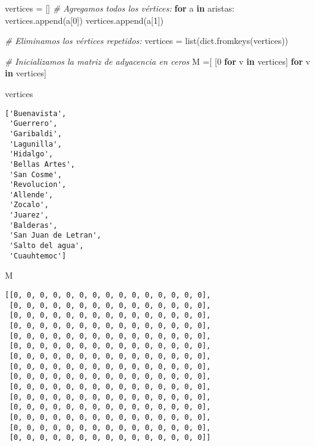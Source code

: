 \documentclass[
]{article}
\newenvironment{Shaded}{}{}
\newcommand{\BuiltInTok}[1]{#1}
\newcommand{\CommentTok}[1]{\textcolor[rgb]{0.38,0.63,0.69}{\textit{#1}}}
\newcommand{\ControlFlowTok}[1]{\textcolor[rgb]{0.00,0.44,0.13}{\textbf{#1}}}
\newcommand{\DecValTok}[1]{\textcolor[rgb]{0.25,0.63,0.44}{#1}}
\newcommand{\KeywordTok}[1]{\textcolor[rgb]{0.00,0.44,0.13}{\textbf{#1}}}
\newcommand{\NormalTok}[1]{#1}
\newcommand{\OperatorTok}[1]{\textcolor[rgb]{0.40,0.40,0.40}{#1}}
\begin{document}
\begin{Shaded}
\begin{Highlighting}[]
\NormalTok{vertices }\OperatorTok{=}\NormalTok{ []}
\CommentTok{\# Agregamos todos los vértices:}
\ControlFlowTok{for}\NormalTok{ a }\KeywordTok{in}\NormalTok{ aristas:}
\NormalTok{  vertices.append(a[}\DecValTok{0}\NormalTok{])}
\NormalTok{  vertices.append(a[}\DecValTok{1}\NormalTok{])}

\CommentTok{\# Eliminamos los vértices repetidos:}
\NormalTok{vertices }\OperatorTok{=} \BuiltInTok{list}\NormalTok{(}\BuiltInTok{dict}\NormalTok{.fromkeys(vertices))}

\CommentTok{\# Inicializamos la matriz de adyacencia en ceros}
\NormalTok{M }\OperatorTok{=}\NormalTok{[ [}\DecValTok{0} \ControlFlowTok{for}\NormalTok{ v }\KeywordTok{in}\NormalTok{ vertices] }\ControlFlowTok{for}\NormalTok{ v }\KeywordTok{in}\NormalTok{ vertices]}
\end{Highlighting}
\end{Shaded}

\begin{Shaded}
\begin{Highlighting}[]
\NormalTok{vertices}
\end{Highlighting}
\end{Shaded}

\begin{verbatim}
['Buenavista',
 'Guerrero',
 'Garibaldi',
 'Lagunilla',
 'Hidalgo',
 'Bellas Artes',
 'San Cosme',
 'Revolucion',
 'Allende',
 'Zocalo',
 'Juarez',
 'Balderas',
 'San Juan de Letran',
 'Salto del agua',
 'Cuauhtemoc']
\end{verbatim}

\begin{Shaded}
\begin{Highlighting}[]
\NormalTok{M}
\end{Highlighting}
\end{Shaded}

\begin{verbatim}
[[0, 0, 0, 0, 0, 0, 0, 0, 0, 0, 0, 0, 0, 0, 0],
 [0, 0, 0, 0, 0, 0, 0, 0, 0, 0, 0, 0, 0, 0, 0],
 [0, 0, 0, 0, 0, 0, 0, 0, 0, 0, 0, 0, 0, 0, 0],
 [0, 0, 0, 0, 0, 0, 0, 0, 0, 0, 0, 0, 0, 0, 0],
 [0, 0, 0, 0, 0, 0, 0, 0, 0, 0, 0, 0, 0, 0, 0],
 [0, 0, 0, 0, 0, 0, 0, 0, 0, 0, 0, 0, 0, 0, 0],
 [0, 0, 0, 0, 0, 0, 0, 0, 0, 0, 0, 0, 0, 0, 0],
 [0, 0, 0, 0, 0, 0, 0, 0, 0, 0, 0, 0, 0, 0, 0],
 [0, 0, 0, 0, 0, 0, 0, 0, 0, 0, 0, 0, 0, 0, 0],
 [0, 0, 0, 0, 0, 0, 0, 0, 0, 0, 0, 0, 0, 0, 0],
 [0, 0, 0, 0, 0, 0, 0, 0, 0, 0, 0, 0, 0, 0, 0],
 [0, 0, 0, 0, 0, 0, 0, 0, 0, 0, 0, 0, 0, 0, 0],
 [0, 0, 0, 0, 0, 0, 0, 0, 0, 0, 0, 0, 0, 0, 0],
 [0, 0, 0, 0, 0, 0, 0, 0, 0, 0, 0, 0, 0, 0, 0],
 [0, 0, 0, 0, 0, 0, 0, 0, 0, 0, 0, 0, 0, 0, 0]]
\end{verbatim}
\end{document}
